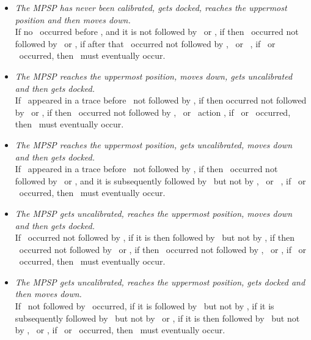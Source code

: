 \begin{itemize}
\begin{itemize}
        \item \textit{The MPSP has never been calibrated, gets docked, reaches the uppermost position and then moves down.}\\
        If no \setStandardHeight\ occurred before \dock, and it is not followed by \undock\ or \setStandardHeight, if then \uppermostReached\ occurred not followed by \undock\ or \setStandardHeight, if after that \motorDown\ occurred not followed by  \undock, \setStandardHeight\ or \uppermostReached\  , if \pressUp\ or \pressDown\ occurred, then \motorUp\ must eventually occur.

        \item \textit{The MPSP reaches the uppermost position, moves down, gets uncalibrated and then gets docked.}\\
        If \uppermostReached\ appeared in a trace before \motorDown\ not followed by \uppermostReached, if then \resetStandardHeight occurred not followed by \setStandardHeight\ or \uppermostReached, if then \dock\ occurred not followed by \undock, \setStandardHeight\ or \uppermostReached\ action , if \pressUp\ or \pressDown\ occurred, then \motorUp\ must eventually occur.

        \item \textit{The MPSP reaches the uppermost position, gets uncalibrated, moves down and then gets docked.}\\
        If \uppermostReached\ appeared in a trace before \resetStandardHeight\ not followed by \setStandardHeight, if then \motorDown\ occurred not followed by \setStandardHeight\ or \uppermostReached, and it is subsequently followed by \dock\ but not by \undock, \setStandardHeight\ or \uppermostReached\  , if \pressUp\ or \pressDown\ occurred, then \motorUp\ must eventually occur.

        \item \textit{The MPSP gets uncalibrated, reaches the uppermost position, moves down and then gets docked.}\\
        If \resetStandardHeight\ occurred not followed by \setStandardHeight, if it is then followed by \uppermostReached\ but not by \setStandardHeight, if then \motorDown\ occurred not followed by \setStandardHeight\ or \uppermostReached, if then \dock\ occurred not followed by \undock, \setStandardHeight\ or \uppermostReached, if \pressUp\ or \pressDown\ occurred, then \motorUp\ must eventually occur.

        \item \textit{The MPSP gets uncalibrated, reaches the uppermost position, gets docked and then moves down.}\\
        If \resetStandardHeight\ not followed by \setStandardHeight\ occurred, if it is followed by \uppermostReached\ but not by \setStandardHeight, if it is subsequently followed by \dock\ but not by \undock\ or \setStandardHeight, if it is then followed by \motorDown\ but not by \setStandardHeight, \uppermostReached\ or \emergencyMode, if \pressUp\ or \pressDown\ occurred, then \motorUp\ must eventually occur.


\end{itemize}
\end{itemize}
